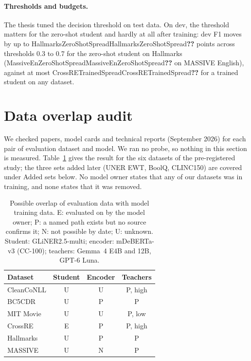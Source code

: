 \documentclass[11pt]{article}
\newcommand{\res}[1]{\ifcsname #1\endcsname\csname #1\endcsname\else\textbf{??}\fi}
\begin{document}
\paragraph{Thresholds and budgets.} The thesis tuned the decision threshold on test data. On dev, the threshold matters for the zero-shot student and hardly at all after training: dev F1 moves by up to \res{HallmarksZeroShotSpread} points across thresholds 0.3 to 0.7 for the zero-shot student on Hallmarks (\res{MassiveEnZeroShotSpread} on MASSIVE English), against at most \res{CrossRETrainedSpread} for a trained student on any dataset.

\section{Data overlap audit}
\label{sec:audit}

We checked papers, model cards and technical reports (September 2026) for each pair of evaluation dataset and model. We ran no probe, so nothing in this section is measured. Table~\ref{tab:audit} gives the result for the six datasets of the pre-registered study; the three sets added later (UNER EWT, BoolQ, CLINC150) are covered under Added sets below. No model owner states that any of our datasets was in training, and none states that it was removed.

\begin{table}[h]
\centering
\small
\begin{tabular}{lccc}
\toprule
Dataset & Student & Encoder & Teachers \\
\midrule
CleanCoNLL & U & U & P, high \\
BC5CDR & U & P & P \\
MIT Movie & U & U & P, low \\
CrossRE & E & P & P, high \\
Hallmarks & U & P & P \\
MASSIVE & U & N & P \\
\bottomrule
\end{tabular}
\caption{Possible overlap of evaluation data with model training data. E: evaluated on by the model owner; P: a named path exists but no source confirms it; N: not possible by date; U: unknown. Student: GLiNER2.5-multi; encoder: mDeBERTa-v3 (CC-100); teachers: Gemma~4 E4B and 12B, GPT-6 Luna.}
\label{tab:audit}
\end{table}
\end{document}
